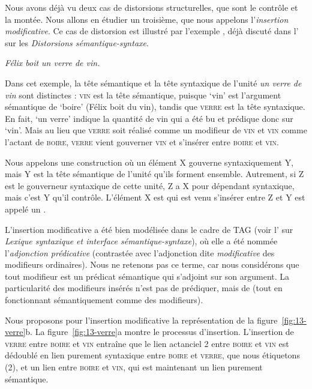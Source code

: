 Nous avons déjà vu deux cas de distorsions structurelles, que sont le contrôle et la montée. Nous allons en étudier un troisième, que nous appelons l’\textit{insertion modificative}. Ce cas de distorsion est illustré par l’exemple , déjà discuté dans l’ sur les \textit{Distorsions sémantique-syntaxe}.

\ea\label{ex:13-verre} \textit{Félix boit un verre de vin.}\z

Dans cet exemple, la tête sémantique et la tête syntaxique de l’unité \textit{un verre de vin} sont distinctes : \textsc{vin} est la tête sémantique, puisque ‘vin’ est l’argument sémantique de ‘boire’ (Félix boit du vin), tandis que \textsc{verre} est la tête syntaxique. En fait, ‘un verre’ indique la quantité de vin qui a été bu et prédique donc sur ‘vin’. Mais au lieu que \textsc{verre} soit réalisé comme un modifieur de \textsc{vin} et \textsc{vin} comme l’actant de \textsc{boire}, \textsc{verre} vient gouverner \textsc{vin} et s’insérer entre \textsc{boire} et \textsc{vin}.

{Nous appelons  une construction où un élément X gouverne syntaxiquement Y, mais Y est la tête sémantique de l’unité qu’ils forment ensemble. Autrement, si Z est le gouverneur syntaxique de cette unité, Z a X pour dépendant syntaxique, mais c’est Y qu’il contrôle. L’élément X est qui est venu s’insérer entre Z et Y est appelé un .}

L’insertion modificative a été bien modélisée dans le cadre de TAG (voir l’ sur \textit{Lexique syntaxique et interface sémantique-syntaxe}), où elle a été nommée l’\textit{adjonction prédicative} (contrastée avec l’adjonction dite \textit{modificative} des modifieurs ordinaires). Nous ne retenons pas ce terme, car nous considérons que tout modifieur est un prédicat sémantique qui s’adjoint sur son argument. La particularité des modifieurs insérés n'est pas de prédiquer, mais de  (tout en fonctionnant sémantiquement comme des modifieurs).

\begin{sloppypar}
Nous proposons pour l’insertion modificative la représentation de la figure~\ref{fig:13-verre}b. La figure~\ref{fig:13-verre}a montre le processus d’insertion. L'insertion de \textsc{verre} entre \textsc{boire} et \textsc{vin} entraîne que le lien actanciel 2 entre \textsc{boire} et \textsc{vin} est dédoublé en lien purement syntaxique entre \textsc{boire} et \textsc{verre}, que nous étiquetons (2), et un lien entre \textsc{boire} et \textsc{vin}, qui est maintenant un lien purement sémantique.
\end{sloppypar}

